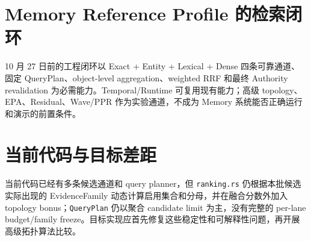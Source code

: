 \section{Memory Reference Profile 的检索闭环}

10 月 27 日前的工程闭环以 Exact + Entity + Lexical + Dense 四条可靠通道、固定 QueryPlan、object-level aggregation、weighted RRF 和最终 Authority revalidation 为必需能力。Temporal/Runtime 可复用现有能力；高级 topology、EPA、Residual、Wave/PPR 作为实验通道，不成为 Memory 系统能否正确运行和演示的前置条件。

\section{当前代码与目标差距}

当前代码已经有多条候选通道和 query planner，但 \texttt{ranking.rs} 仍根据本批候选实际出现的 EvidenceFamily 动态计算启用集合和分母，并在融合分数外加入 topology bonus；\texttt{QueryPlan} 仍以聚合 candidate limit 为主，没有完整的 per-lane budget/family freeze。目标实现应首先修复这些稳定性和可解释性问题，再开展高级拓扑算法比较。\cite{nous-code-snapshot,nous-research-package}
